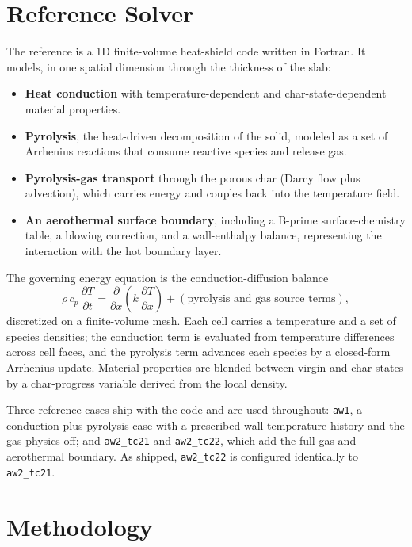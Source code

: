 \documentclass[conference]{IEEEtran}
\begin{document}
\section{Reference Solver}
The reference is a 1D finite-volume heat-shield code written in Fortran. It models,
in one spatial dimension through the thickness of the slab:
\begin{itemize}
  \item \textbf{Heat conduction} with temperature-dependent and
  char-state-dependent material properties.
  \item \textbf{Pyrolysis}, the heat-driven decomposition of the solid, modeled as
  a set of Arrhenius reactions that consume reactive species and release gas.
  \item \textbf{Pyrolysis-gas transport} through the porous char (Darcy flow plus
  advection), which carries energy and couples back into the temperature field.
  \item \textbf{An aerothermal surface boundary}, including a B-prime
  surface-chemistry table, a blowing correction, and a wall-enthalpy balance,
  representing the interaction with the hot boundary layer.
\end{itemize}
The governing energy equation is the conduction-diffusion balance
\begin{equation}
\rho\, c_p\, \frac{\partial T}{\partial t}
  = \frac{\partial}{\partial x}\!\left(k\, \frac{\partial T}{\partial x}\right)
  + (\text{pyrolysis and gas source terms}),
\end{equation}
discretized on a finite-volume mesh. Each cell carries a temperature and a set of
species densities; the conduction term is evaluated from temperature differences
across cell faces, and the pyrolysis term advances each species by a closed-form
Arrhenius update. Material properties are blended between virgin and char states by
a char-progress variable derived from the local density.

Three reference cases ship with the code and are used throughout: \texttt{aw1}, a
conduction-plus-pyrolysis case with a prescribed wall-temperature history and the
gas physics off; and \texttt{aw2\_tc21} and \texttt{aw2\_tc22}, which add the full
gas and aerothermal boundary. As shipped, \texttt{aw2\_tc22} is configured
identically to \texttt{aw2\_tc21}.

\section{Methodology}
\end{document}
